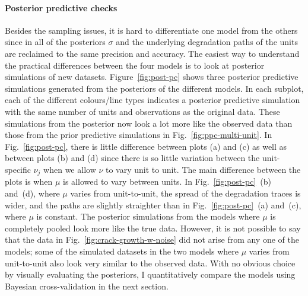 \paragraph{Posterior predictive checks} Besides the sampling issues, it is hard to differentiate one model from the others since in all of the posteriors $\sigma$ and the underlying degradation paths of the units are reclaimed to the same precision and accuracy. The easiest way to understand the practical differences between the four models is to look at posterior simulations of new datasets. Figure~\ref{fig:post-pc} shows three posterior predictive simulations generated from the posteriors of the different models. In each subplot, each of the different colours/line types indicates a posterior predictive simulation with the same number of units and observations as the original data. These simulations from the posterior now look a lot more like the observed data than those from the prior predictive simulations in Fig.~\ref{fig:ppc-multi-unit}. In Fig.~\ref{fig:post-pc}, there is little difference between plots (a) and (c) as well as between plots (b) and (d) since there is so little variation between the unit-specific $\nu_j$ when we allow $\nu$ to vary unit to unit. The main difference between the plots is when $\mu$ is allowed to vary between units. In Fig.~\ref{fig:post-pc}~(b) and~(d), where $\mu$ varies from unit-to-unit, the spread of the degradation traces is wider, and the paths are slightly straighter than in Fig.~\ref{fig:post-pc}~(a) and~(c), where $\mu$ is constant. The posterior simulations from the models where $\mu$ is completely pooled look more like the true data. However, it is not possible to say that the data in Fig.~\ref{fig:crack-growth-w-noise} did not arise from any one of the models; some of the simulated datasets in the two models where $\mu$ varies from unit-to-unit also look very similar to the observed data. With no obvious choice by visually evaluating the posteriors, I quantitatively compare the models using Bayesian cross-validation in the next section.

